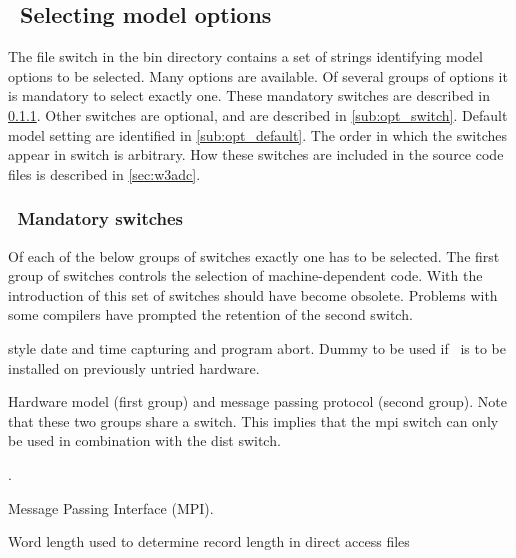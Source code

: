 \vssub
\subsection{~Selecting model options} \label{sec:switches}
\vssub

The file {\file switch} in the {\file bin} directory contains a set of strings
identifying model options to be selected. Many options are available. Of
several groups of options it is mandatory to select exactly one. These
mandatory switches are described in \para\ref{sub:man_switch}. Other switches
are optional, and are described in \para\ref{sub:opt_switch}. Default model
setting are identified in \para\ref{sub:opt_default}. The order in which the
switches appear in {\file switch} is arbitrary. How these switches are
included in the source code files is described in \para\ref{sec:w3adc}.

\vsssub
\subsubsection{~Mandatory switches} \label{sub:man_switch}
\vsssub

Of each of the below groups of switches exactly one has to be selected. The
first group of switches controls the selection of machine-dependent code. With
the introduction of  this set of switches should have become
obsolete. Problems with some compilers have prompted the retention of the
second switch.
\begin{slist}
 { style date and time capturing and program
           abort.}
 {Dummy to be used if \ws\ is to be installed on
           previously untried hardware.}
\end{slist}

\noindent
Hardware model (first group) and message passing protocol (second group). Note
that these two groups share a switch. This implies that the {\sc mpi} switch
can only be used in combination with the {\sc dist} switch.
\begin{slist}
.
\end{slist}

\begin{slist}
 {Message Passing Interface (MPI).}
\end{slist}

\noindent
Word length used to determine record length in direct access files
\begin{slist}
\end{slist}

